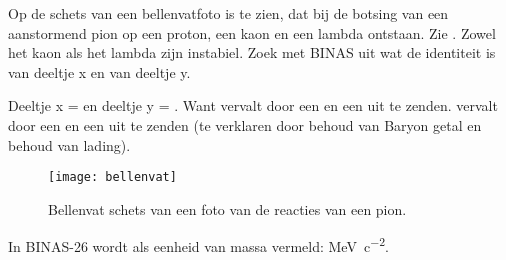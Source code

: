 \begin{questions}

\question
Op de schets van een bellenvatfoto is te zien, dat bij de botsing van een
aanstormend pion op een proton, een kaon en een lambda ontstaan. Zie
.
Zowel het kaon als het lambda zijn instabiel.
Zoek met BINAS uit wat de identiteit is van deeltje x en van deeltje y.
\begin{solution}
    Deeltje x = \Ppiplus en deeltje y = \Pp.  Want \PKzero vervalt door
    een \Ppiplus en een \Ppiminus uit te zenden. \PLambda vervalt door een
    \Ppiminus en een \Pp uit te zenden (te verklaren door behoud van
    Baryon getal en behoud van lading).
\end{solution}
\begin{figure}[h]
    \centering
    \texttt{[image: bellenvat]}
    \caption{Bellenvat schets van een foto van de reacties van een pion.}
    \label{fig:bellenvat}
\end{figure}


\question
In BINAS-26 wordt als eenheid van massa vermeld: \si{MeV.c^{-2}}.
\end{questions}
